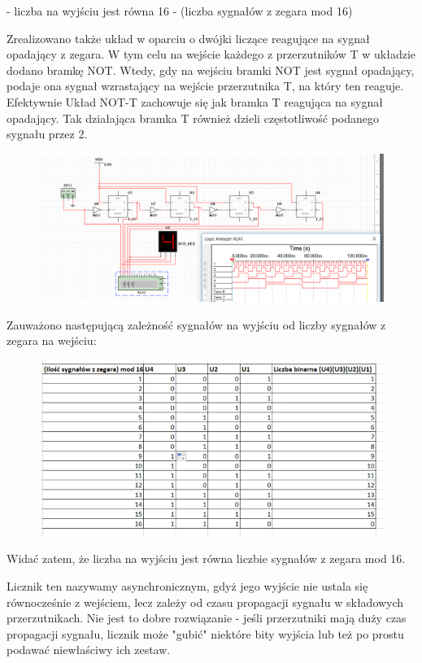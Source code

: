 \documentclass[12pt,a4paper]{article}
\begin{document}
- liczba na wyjściu jest równa 16 - (liczba sygnałów z zegara mod 16)
\par
\par 
Zrealizowano także układ w oparciu o dwójki liczące reagujące na sygnał opadający z zegara. W tym celu na wejście każdego z przerzutników T w układzie dodano bramkę NOT. 
Wtedy, gdy na wejściu bramki NOT jest sygnał opadający, podaje ona sygnał wzrastający na wejście przerzutnika T, na który ten reaguje. Efektywnie Układ NOT-T zachowuje się jak bramka T reagująca na sygnał opadający. Tak działająca bramka T również dzieli częstotliwość podanego sygnału przez 2.


\begin{figure}[H]
\centering
\includegraphics[width=\textwidth]{img/4b_opad}
\end{figure}

Zauważono następującą zależność sygnałów na wyjściu od liczby sygnałów z zegara na wejściu:
\begin{figure}[H]
\centering
\includegraphics[width=\textwidth]{img/4b_opad_table}
\end{figure}

Widać zatem, że liczba na wyjściu jest równa liczbie sygnałów z zegara mod 16.

\par
Licznik ten nazywamy asynchronicznym, gdyż jego wyjście nie ustala się równocześnie z wejściem, lecz zależy od czasu propagacji sygnału w składowych przerzutnikach. Nie jest to dobre rozwiązanie - jeśli przerzutniki mają duży czas propagacji sygnału, licznik może "gubić" niektóre bity wyjścia lub też po prostu podawać niewłaściwy ich zestaw.
\end{document}
